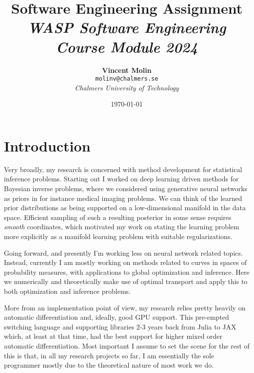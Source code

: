 \documentclass[11pt]{diazessay}
\title{\textbf{Software Engineering Assignment} \\ {\large\itshape WASP Software Engineering Course Module 2024}}
\author{\textbf{Vincent Molin} \\ \small \texttt{molinv@chalmers.se}\\ \textit{Chalmers University of Technology}}
\date{\today}
\begin{document}
\maketitle








\section*{Introduction}

Very broadly, my research is concerned with method development for statistical inference problems. Starting out I worked on deep learning driven methods for Bayesian inverse problems, where we considered using generative neural networks as priors in for instance medical imaging problems. We can think of the learned prior distributions as being supported on a low-dimensional manifold in the data space. Efficient sampling of such a resulting posterior in some sense requires \textit{smooth} coordinates, which motivated my work on stating the learning problem more explicitly as a manifold learning problem with suitable regularizations. 

Going forward, and presently I'm working less on neural network related topics. Instead, currently I am mostly working on methods related to curves in spaces of probability measures, with applications to global optimization and inference. Here we numerically and theoretically make use of optimal transport and apply this to both optimization and inference problems. 

More from an implementation point of view, my research relies pretty heavily on automatic differentiation and, ideally, good GPU support. This pre-empted switching language and supporting libraries 2-3 years back from Julia to JAX which, at least at that time, had the best support for higher mixed order automatic differentiation. Most important I assume to set the scene for the rest of this is that, in all my research projects so far, I am essentially the sole programmer mostly due to the theoretical nature of most work we do. 
\end{document}
